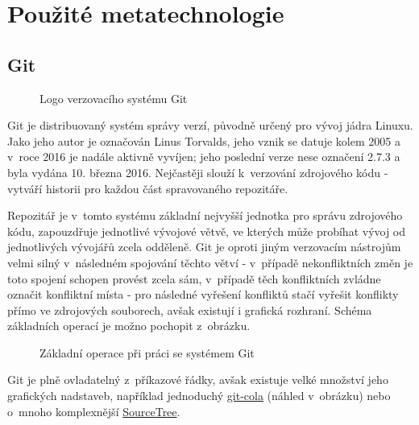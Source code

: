 \section{Použité metatechnologie}
\label{sec:used-metatechnologies}

\subsection{Git}
\label{subsec:git}

\begin{figure}
 \centering
 
 \caption{Logo verzovacího systému Git}
\end{figure}

Git je distribuovaný systém správy verzí, původně určený pro vývoj jádra Linuxu. Jako jeho autor je označován Linus Torvalds\cite{git-docs}, jeho vznik se datuje kolem 2005 a v~roce 2016 je nadále aktivně vyvíjen; jeho poslední verze nese označení 2.7.3 a byla vydána 10. března 2016. Nejčastěji slouží k~verzování zdrojového kódu - vytváří historii pro každou část spravovaného repozitáře.

Repozitář je v~tomto systému základní nejvyšší jednotka pro správu zdrojového kódu, zapouzdřuje jednotlivé vývojové větvě, ve kterých může probíhat vývoj od jednotlivých vývojářů zcela odděleně. Git je oproti jiným verzovacím nástrojům velmi silný v~následném spojování těchto větví - v~případě nekonfliktních změn je toto spojení schopen provést zcela sám, v~případě těch konfliktních zvládne označit konfliktní místa - pro následné vyřešení konfliktů stačí vyřešit konflikty přímo ve zdrojových souborech, avšak existují i grafická rozhraní. Schéma základních operací je možno pochopit z~obrázku.

\begin{figure}[H]
 	\centering
 	
 	\caption[Základní operace při práci se systémem Git]{Základní operace při práci se systémem Git\cite{basic-git-svg}}
 	\label{fig:git-operations}
\end{figure}

Git je plně ovladatelný z~příkazové řádky, avšak existuje velké množství jeho grafických nadstaveb, například jednoduchý \href{http://git-cola.github.io/}{git-cola} (náhled v~obrázku) nebo o~mnoho komplexnější \href{https://www.sourcetreeapp.com/}{SourceTree}.

